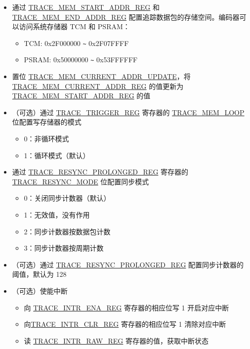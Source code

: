 \documentclass[main\_\_CN.tex]{subfiles}
\begin{document}
\begin{itemize}
    \item 通过 \hyperref[regdesc:TRACEMEMSTARTADDRREG]{TRACE\_MEM\_START\_ADDR\_REG} 和 \hyperref[regdesc:TRACEMEMENDADDRREG]{TRACE\_MEM\_END\_ADDR\_REG} 配置追踪数据包的存储空间。编码器可以访问系统存储器 TCM 和 PSRAM：
        \begin{itemize}
            \item TCM: 0x2F000000 \verb+~+ 0x2F07FFFF
            \item PSRAM: 0x50000000 \verb+~+ 0x53FFFFFF
        \end{itemize}
    \item 置位 \hyperref[fielddesc:TRACEMEMCURRENTADDRUPDATE]{TRACE\_MEM\_CURRENT\_ADDR\_UPDATE}，将 \hyperref[regdesc:TRACEMEMCURRENTADDRREG]{TRACE\_MEM\_CURRENT\_ADDR\_REG} 的值更新为 \hyperref[regdesc:TRACEMEMSTARTADDRREG]{TRACE\_MEM\_START\_ADDR\_REG} 的值

    \item（可选）通过 \hyperref[regdesc:TRACETRIGGERREG]{TRACE\_TRIGGER\_REG} 寄存器的 \hyperref[fielddesc:TRACEMEMLOOP]{TRACE\_MEM\_LOOP} 位配置写存储器的模式
        \begin{itemize}
            \item 0：非循环模式
            \item 1：循环模式（默认）
        \end{itemize}


    \item 通过 \hyperref[regdesc:TRACERESYNCPROLONGEDREG]{TRACE\_RESYNC\_PROLONGED\_REG} 寄存器的 \hyperref[fielddesc:TRACERESYNCMODE]{TRACE\_RESYNC\_MODE} 位配置同步模式
        \begin{itemize}
            \item 0：关闭同步计数器（默认）
            \item 1：无效值，没有作用
            \item 2：同步计数器按数据包计数
            \item 3：同步计数器按周期计数
                \end{itemize}

    \item（可选）通过 \hyperref[regdesc:TRACERESYNCPROLONGEDREG]{TRACE\_RESYNC\_PROLONGED\_REG} 配置同步计数器的阈值，默认为 128

    \item（可选）使能中断
        \begin{itemize}
            \item 向 \hyperref[regdesc:TRACEINTRENAREG]{TRACE\_INTR\_ENA\_REG} 寄存器的相应位写 1 开启对应中断
            \item 向\hyperref[regdesc:TRACEINTRCLRREG]{TRACE\_INTR\_CLR\_REG} 寄存器的相应位写 1 清除对应中断
            \item 读 \hyperref[regdesc:TRACEINTRRAWREG]{TRACE\_INTR\_RAW\_REG} 寄存器的值，获取中断状态
        \end{itemize}


\end{itemize}
\end{document}
